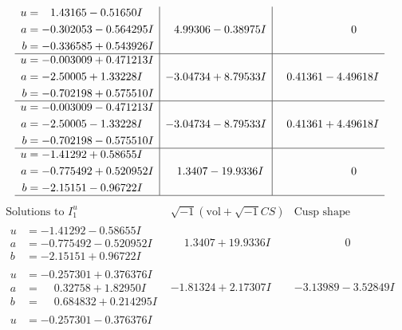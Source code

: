 \documentclass[1p]{elsarticle_modified}
\theoremstyle{definition}
\newcommand{\I}{\sqrt{-1}}
\begin{document}
$$\begin{array}{c|c|c}
\begin{aligned}
u &= \phantom{-}1.43165 - 0.51650 I \\
a &= -0.302053 - 0.564295 I \\
b &= -0.336585 + 0.543926 I\end{aligned}
 & \phantom{-}4.99306 - 0.38975 I & \phantom{-0.000000 } 0 \\ \hline\begin{aligned}
u &= -0.003009 + 0.471213 I \\
a &= -2.50005 + 1.33228 I \\
b &= -0.702198 + 0.575510 I\end{aligned}
 & -3.04734 + 8.79533 I & \phantom{-}0.41361 - 4.49618 I \\ \hline\begin{aligned}
u &= -0.003009 - 0.471213 I \\
a &= -2.50005 - 1.33228 I \\
b &= -0.702198 - 0.575510 I\end{aligned}
 & -3.04734 - 8.79533 I & \phantom{-}0.41361 + 4.49618 I \\ \hline\begin{aligned}
u &= -1.41292 + 0.58655 I \\
a &= -0.775492 + 0.520952 I \\
b &= -2.15151 - 0.96722 I\end{aligned}
 & \phantom{-}1.3407 - 19.9336 I & \phantom{-0.000000 } 0\\
 \hline 
 \end{array}$$\newpage$$\begin{array}{c|c|c}  
\text{Solutions to }I^u_{1}& \I (\text{vol} + \sqrt{-1}CS) & \text{Cusp shape}\\
 \hline 
\begin{aligned}
u &= -1.41292 - 0.58655 I \\
a &= -0.775492 - 0.520952 I \\
b &= -2.15151 + 0.96722 I\end{aligned}
 & \phantom{-}1.3407 + 19.9336 I & \phantom{-0.000000 } 0 \\ \hline\begin{aligned}
u &= -0.257301 + 0.376376 I \\
a &= \phantom{-}0.32758 + 1.82950 I \\
b &= \phantom{-}0.684832 + 0.214295 I\end{aligned}
 & -1.81324 + 2.17307 I & -3.13989 - 3.52849 I \\ \hline\begin{aligned}
u &= -0.257301 - 0.376376 I \\

\end{aligned}
\end{array}$$
\end{document}
